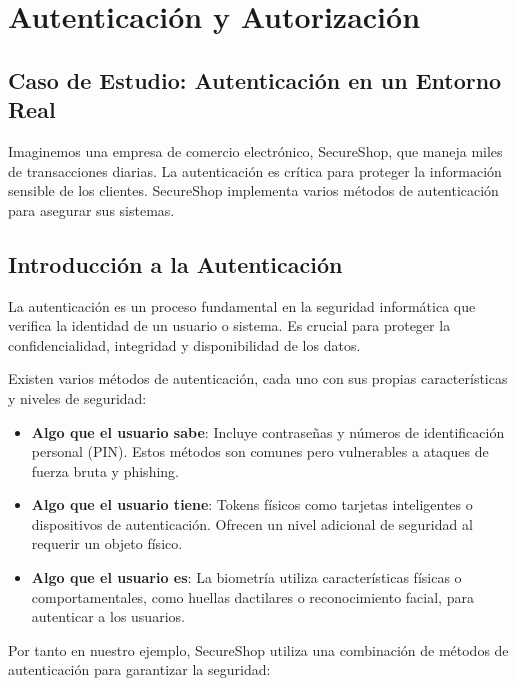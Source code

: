 \chapter{Autenticación y Autorización}
\vspace{95px}
\begin{flushright}
    \textit{ }
\end{flushright}



\section{Caso de Estudio: Autenticación en un Entorno Real}
Imaginemos una empresa de comercio electrónico, SecureShop, que maneja miles de transacciones diarias. La autenticación es crítica para proteger la información sensible de los clientes. SecureShop implementa varios métodos de autenticación para asegurar sus sistemas.


\section{Introducción a la Autenticación}
La autenticación es un proceso fundamental en la seguridad informática que verifica la identidad de un usuario o sistema. Es crucial para proteger la confidencialidad, integridad y disponibilidad de los datos.


Existen varios métodos de autenticación, cada uno con sus propias características y niveles de seguridad:

\begin{itemize}
    \item \textbf{Algo que el usuario sabe}: Incluye contraseñas y números de identificación personal (PIN). Estos métodos son comunes pero vulnerables a ataques de fuerza bruta y phishing.
    \item \textbf{Algo que el usuario tiene}: Tokens físicos como tarjetas inteligentes o dispositivos de autenticación. Ofrecen un nivel adicional de seguridad al requerir un objeto físico.
    \item \textbf{Algo que el usuario es}: La biometría utiliza características físicas o comportamentales, como huellas dactilares o reconocimiento facial, para autenticar a los usuarios.
\end{itemize}

Por tanto en nuestro ejemplo, SecureShop utiliza una combinación de métodos de autenticación para garantizar la seguridad:


